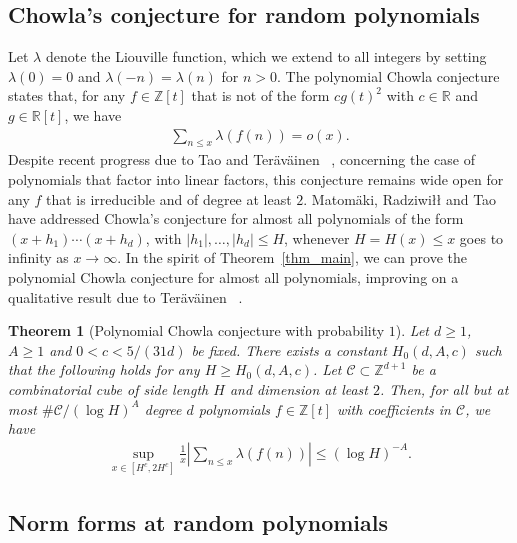 \documentclass[11pt,letterpaper]{amsart}
\renewcommand{\leq}{\leqslant}
\renewcommand{\geq}{\geqslant}
\newtheorem{theorem}{Theorem}[section]
\theoremstyle{definition}
\numberwithin{equation}{section}
\newcommand{\0}{\mathbf{0}}
\begin{document}
\subsection{Chowla's conjecture for random polynomials}

Let $\lambda$ denote the Liouville function, which we extend to all integers by setting $\lambda(0)=0$ and $\lambda(-n)=\lambda(n)$ for $n>0$. 
The polynomial Chowla conjecture~\cite{chowla} states that, for any $f\in \mathbb{Z}[t]$ that is not of the form $cg(t)^2$ with $c\in \mathbb{R}$ and $g\in \mathbb{R}[t]$, we have
\begin{align*}
\sum_{n\leq x}\lambda(f(n))=o(x).    
\end{align*}
Despite recent progress due to Tao and 
Ter{\"a}v{\"a}inen
~\cite{tao-chowla, tt-ant, tt-duke},
concerning  the case of polynomials that factor into linear factors, 
this conjecture  remains wide open for any $f$ that is irreducible and of degree at least $2$. 
Matom\"aki, Radziwiłł and Tao \cite{kaisa} have addressed 
Chowla's conjecture for almost all polynomials of the form
$(x + h_1) \cdots (x + h_d)$,
with $|h_1|,\dots,|h_d| \leq H$, whenever $H=H(x)\leq x$ goes to infinity as $x\to \infty$.
In the spirit of Theorem~\ref{thm_main}, we can prove the polynomial Chowla conjecture for almost all polynomials, improving on a qualitative result due to Ter{\"a}v{\"a}inen
~\cite[Thm.~2.11]{tera-polynomial}. 

\begin{theorem}[Polynomial Chowla conjecture with probability $1$]\label{thm_chowla}
Let $d\geq 1$, $A\geq 1$ and $0<c<5/(31d)$ be fixed. There exists a constant $H_0(d,A,c)$ such that the following holds for any $H\geq H_0(d,A,c)$. Let $\mathscr{C}\subset \mathbb{Z}^{d+1}$ be a combinatorial cube of side length $H$ and dimension at least $2$. Then, for all but at most $\#\mathscr{C}/(\log H)^{A}$ degree $d$ polynomials $f\in \mathbb{Z}[t]$ with coefficients in $\mathscr{C}$, we have
\begin{align*}
\sup_{x\in [H^{c},2H^{c}]}\frac{1}{x}\left|\sum_{n\leq x}\lambda(f(n))\right|\leq (\log H)^{-A}.    
\end{align*}    
\end{theorem}




\subsection{Norm forms at random polynomials}
\end{document}
